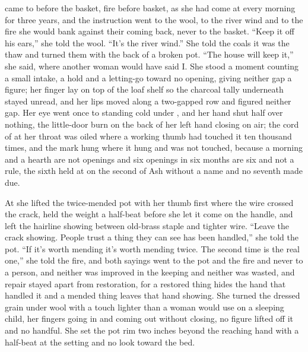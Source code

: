  came to  before the basket, fire before basket, as she had come at every morning for three years, and the instruction went to the wool, to the river wind and to the fire she would bank against their coming back, never to the basket. “Keep it off his ears,” she told the wool. “It's the river wind.” She told the coals it was the thaw and turned them with the back of a broken pot. “The house will keep it,” she said, where another woman would have said I. She stood a moment counting a small intake, a hold and a letting-go toward no opening, giving neither gap a figure; her finger lay on top of the loaf shelf so the charcoal tally underneath stayed unread, and her lips moved along a two-gapped row and figured neither gap. Her eye went once to  standing cold under , and her hand shut half over nothing, the little-door burn on the back of her left hand closing on air; the cord of  at her throat was oiled where a working thumb had touched it ten thousand times, and the mark hung where it hung and was not touched, because a morning and a hearth are not openings and six openings in six months are six and not a rule, the sixth held at  on the second of Ash without a name and no seventh made due.

At  she lifted the twice-mended pot with her thumb first where the wire crossed the crack, held the weight a half-beat before she let it come on the handle, and left the hairline showing between old-brass staple and tighter wire. “Leave the crack showing. People trust a thing they can see has been handled,” she told the pot. “If it's worth mending it's worth mending twice. The second time is the real one,” she told the fire, and both sayings went to the pot and the fire and never to a person, and neither was improved in the keeping and neither was wasted, and repair stayed apart from restoration, for a restored thing hides the hand that handled it and a mended thing leaves that hand showing. She turned the dressed grain under wool with a touch lighter than a woman would use on a sleeping child, her fingers going in and coming out without closing, no figure lifted off it and no handful. She set the pot rim two inches beyond the reaching hand with a half-beat at the setting and no look toward the bed.

